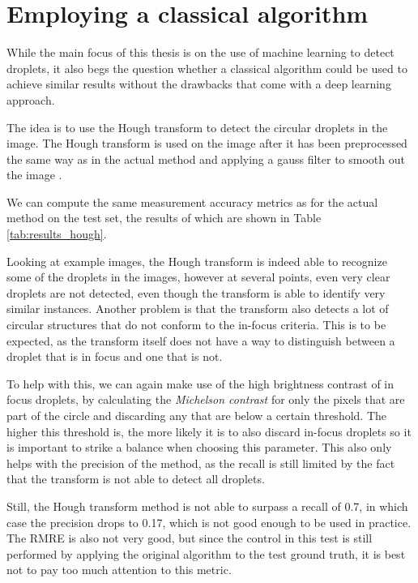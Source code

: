 \section{Employing a classical algorithm}

While the main focus of this thesis is on the use of machine learning to detect droplets, it also begs the question whether a classical algorithm could be used to achieve similar results without the drawbacks that come with a deep learning approach.

The idea is to use the Hough transform to detect the circular droplets in the image. 
The Hough transform is used on the image after it has been preprocessed the same way as in the actual method and applying a gauss filter to smooth out the image \cite{OpenCVFeatureDetection}.

We can compute the same measurement accuracy metrics as for the actual method on the test set, the results of which are shown in Table \ref{tab:results_hough}.

Looking at example images, the Hough transform is indeed able to recognize some of the droplets in the images, however at several points, even very clear droplets are not detected, even though the transform is able to identify very similar instances. 
Another problem is that the transform also detects a lot of circular structures that do not conform to the in-focus criteria. 
This is to be expected, as the transform itself does not have a way to distinguish between a droplet that is in focus and one that is not.

To help with this, we can again make use of the high brightness contrast of in focus droplets, by calculating the \emph{Michelson contrast} for only the pixels that are part of the circle and discarding any that are below a certain threshold.
The higher this threshold is, the more likely it is to also discard in-focus droplets so it is important to strike a balance when choosing this parameter.
This also only helps with the precision of the method, as the recall is still limited by the fact that the transform is not able to detect all droplets.

Still, the Hough transform method is not able to surpass a recall of 0.7, in which case the precision drops to 0.17, which is not good enough to be used in practice.
The RMRE is also not very good, but since the control in this test is still performed by applying the original algorithm to the test ground truth, it is best not to pay too much attention to this metric.

